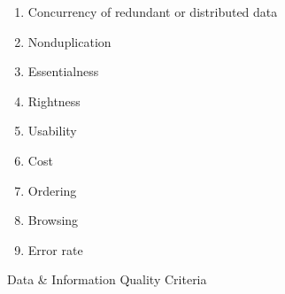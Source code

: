 \begin{figure}[htb]
\begin{multicols}{3}
\begin{enumerate}
            \item Concurrency of redundant or distributed data
            \item Nonduplication
            \item Essentialness
            \item Rightness
            \item Usability
            \item Cost
            \item Ordering
            \item Browsing
            \item Error rate
        \end{enumerate}
    \end{multicols}

    \centering
    \caption{Data \& Information Quality Criteria~\cite{eppler2006}}
    \label{fig:dq-criteria}
\end{figure}
\FloatBarrier

